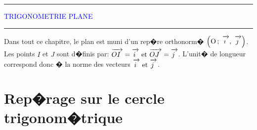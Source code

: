 \documentclass[11pt,dvips]{article}
\def\Oij{$\left(\text{O}\,;~\vect{\imath},~\vect{\jmath}\right)$}
\newcommand{\vect}[1]{\mathchoice%
{\overrightarrow{\displaystyle\mathstrut#1\,\,}}%
{\overrightarrow{\textstyle\mathstrut#1\,\,}}%
{\overrightarrow{\scriptstyle\mathstrut#1\,\,}}%
{\overrightarrow{\scriptscriptstyle\mathstrut#1\,\,}}}
\theoremstyle{break}
\theoremstyle{nonumberbreak}
\begin{document}
\fancyhf{}
\rhead{}%
\lhead{}
\cfoot{\thepage}
\renewcommand \footrulewidth{0.4pt}
\renewcommand \headrulewidth{0pt}
\pagestyle{fancy}

\color{blue}
\hrule%
\vspace{0.4cm}
\begin{center}
\textcolor{blue}{\LARGE\textsc{TRIGONOMETRIE PLANE}}
\end{center}
\hrule%

\vspace*{1.5cm}

\renewcommand{\contentsname}{%
Table des mati�res}%
\tableofcontents

\setlength{\parskip}{3ex plus 1ex minus 1ex}
\setlength{\parindent}{0cm} 
\color{black}
\pagebreak

Dans tout ce chapitre, le plan est muni d'un rep�re orthonorm� \Oij.
Les points $I$ et $J$ sont d�finis par: $\vect{OI}=\vect{i} \text{ et } \vect{OJ}=\vect{j}$.
L'unit� de longueur correspond donc � la norme des vecteurs $\vect{i}\text{ et }\vect{j}$.
\section{Rep�rage sur le cercle trigonom�trique}
\end{document}
